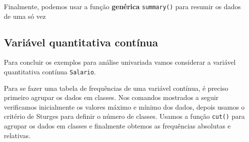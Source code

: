 \documentclass[10pt,a4paper]{book}
\newenvironment{Shaded}{\begin{snugshade}}{\end{snugshade}}
\newcommand{\KeywordTok}[1]{\textcolor[rgb]{0.13,0.29,0.53}{\textbf{#1}}}
\newcommand{\StringTok}[1]{\textcolor[rgb]{0.31,0.60,0.02}{#1}}
\newcommand{\OperatorTok}[1]{\textcolor[rgb]{0.81,0.36,0.00}{\textbf{#1}}}
\newcommand{\NormalTok}[1]{#1}
\begin{document}
Finalmente, podemos usar a função \textbf{genérica} \texttt{summary()}
para resumir os dados de uma só vez

\begin{Shaded}
\end{Shaded}

\subsection{Variável quantitativa
contínua}\label{variuxe1vel-quantitativa-contuxednua}

Para concluir os exemplos para análise univariada vamos considerar a
variável quantitativa contínua \texttt{Salario}.

Para se fazer uma tabela de frequências de uma variável contínua, é
preciso primeiro agrupar os dados em classes. Nos comandos mostrados a
seguir verificamos inicialmente os valores máximo e mínimo dos dados,
depois usamos o critério de Sturges para definir o número de classes.
Usamos a função \texttt{cut()} para agrupar os dados em classes e
finalmente obtemos as frequências absolutas e relativas.
\end{document}
